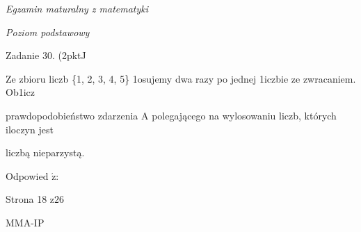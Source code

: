 \documentclass[a4paper,12pt]{article}
\begin{document}
{\it Egzamin maturalny z matematyki}

{\it Poziom podstawowy}

Zadanie 30. (2pktJ

Ze zbioru liczb \{1, 2, 3, 4, 5\} 1osujemy dwa razy po jednej 1iczbie ze zwracaniem. Ob1icz

prawdopodobieństwo zdarzenia A polegającego na wylosowaniu liczb, których iloczyn jest

liczbą nieparzystą.

Odpowied $\acute{\mathrm{z}}$:

Strona 18 $\mathrm{z}26$

MMA-IP
\end{document}
